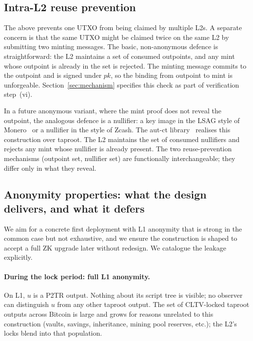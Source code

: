 \documentclass[11pt,a4paper]{article}
\begin{document}
\subsection{Intra-L2 reuse prevention}

The above prevents one UTXO from being claimed by multiple L2s. A separate concern is that the same UTXO might be claimed twice on the same L2 by submitting two minting messages. The basic, non-anonymous defence is straightforward: the L2 maintains a set of consumed outpoints, and any mint whose outpoint is already in the set is rejected. The minting message commits to the outpoint and is signed under $pk$, so the binding from outpoint to mint is unforgeable. Section~\ref{sec:mechanism} specifies this check as part of verification step~(vi).

In a future anonymous variant, where the mint proof does not reveal the outpoint, the analogous defence is a nullifier: a key image in the LSAG style of Monero~\cite{lsag} or a nullifier in the style of Zcash. The aut-ct library~\cite{autct} realises this construction over taproot. The L2 maintains the set of consumed nullifiers and rejects any mint whose nullifier is already present. The two reuse-prevention mechanisms (outpoint set, nullifier set) are functionally interchangeable; they differ only in what they reveal.

\subsection{Anonymity properties: what the design delivers, and what it defers}

\label{sec:anon}

We aim for a concrete first deployment with L1 anonymity that is strong in the common case but not exhaustive, and we ensure the construction is shaped to accept a full ZK upgrade later without redesign. We catalogue the leakage explicitly.

\paragraph{During the lock period: full L1 anonymity.} On L1, $u$ is a P2TR output. Nothing about its script tree is visible; no observer can distinguish $u$ from any other taproot output. The set of CLTV-locked taproot outputs across Bitcoin is large and grows for reasons unrelated to this construction (vaults, savings, inheritance, mining pool reserves, etc.); the L2's locks blend into that population.
\end{document}
